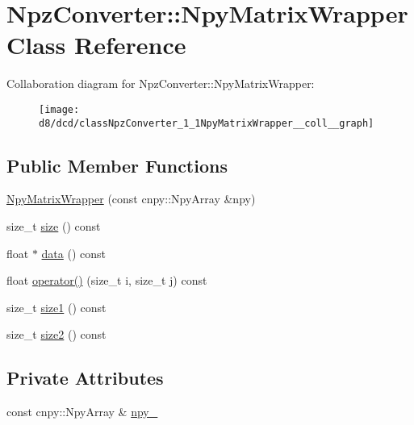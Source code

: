 \hypertarget{classNpzConverter_1_1NpyMatrixWrapper}{}\section{Npz\+Converter\+:\+:Npy\+Matrix\+Wrapper Class Reference}
\label{classNpzConverter_1_1NpyMatrixWrapper}


Collaboration diagram for Npz\+Converter\+:\+:Npy\+Matrix\+Wrapper\+:
\nopagebreak
\begin{figure}[H]
\begin{center}
\leavevmode
\texttt{[image: d8/dcd/classNpzConverter\_1\_1NpyMatrixWrapper\_\_coll\_\_graph]}
\end{center}
\end{figure}
\subsection*{Public Member Functions}
\begin{DoxyCompactItemize}
\item 
\hyperlink{classNpzConverter_1_1NpyMatrixWrapper_a12589425c3fa4565316a0ff9ceea6456}{Npy\+Matrix\+Wrapper} (const cnpy\+::\+Npy\+Array \&npy)
\item 
size\+\_\+t \hyperlink{classNpzConverter_1_1NpyMatrixWrapper_a245093ae856204f1c9da73cb97ab1672}{size} () const 
\item 
float $\ast$ \hyperlink{classNpzConverter_1_1NpyMatrixWrapper_a1bb6c63b0182eef3d5938b696101d4f8}{data} () const 
\item 
float \hyperlink{classNpzConverter_1_1NpyMatrixWrapper_a9f118068f570b5a013bca27ca993d00f}{operator()} (size\+\_\+t i, size\+\_\+t j) const 
\item 
size\+\_\+t \hyperlink{classNpzConverter_1_1NpyMatrixWrapper_a41f3130d4d75c67a50f886264f5fddc1}{size1} () const 
\item 
size\+\_\+t \hyperlink{classNpzConverter_1_1NpyMatrixWrapper_a90bcb80b9724c796dafba354a181b71a}{size2} () const 
\end{DoxyCompactItemize}
\subsection*{Private Attributes}
\begin{DoxyCompactItemize}
\item 
const cnpy\+::\+Npy\+Array \& \hyperlink{classNpzConverter_1_1NpyMatrixWrapper_a4a32de31f6410ae49105b9d719de028b}{npy\+\_\+}
\end{DoxyCompactItemize}


